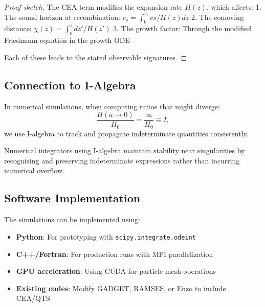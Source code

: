 \begin{proof}[Proof sketch]
The CEA term modifies the expansion rate $H(z)$, which affects:
1. The sound horizon at recombination: $r_s = \int_0^{z_*} cs/H(z) dz$
2. The comoving distance: $\chi(z) = \int_0^z dz'/H(z')$
3. The growth factor: Through the modified Friedmann equation in the growth ODE

Each of these leads to the stated observable signatures.
\end{proof}

\subsection{Connection to I-Algebra}

\begin{definition}
In numerical simulations, when computing ratios that might diverge:
\[
\frac{H(a \to 0)}{H_0} = \frac{\infty}{H_0} \equiv I,
\]
we use I-algebra to track and propagate indeterminate quantities consistently.
\end{definition}

\begin{proposition}
Numerical integrators using I-algebra maintain stability near singularities by recognizing and preserving indeterminate expressions rather than incurring numerical overflow.
\end{proposition}

\subsection{Software Implementation}

\begin{remark}
The simulations can be implemented using:
\begin{itemize}
\item \textbf{Python}: For prototyping with \texttt{scipy.integrate.odeint}
\item \textbf{C++/Fortran}: For production runs with MPI parallelization
\item \textbf{GPU acceleration}: Using CUDA for particle-mesh operations
\item \textbf{Existing codes}: Modify GADGET, RAMSES, or Enzo to include CEA/QTS
\end{itemize}
\end{remark}
